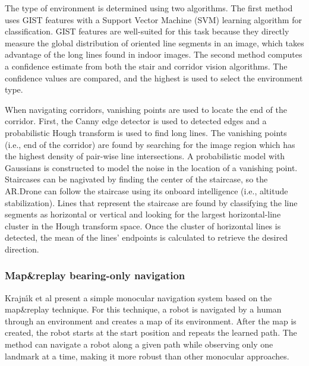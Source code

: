 The type of environment is determined using two algorithms.
The first method uses GIST features \cite{oliva2001modeling} with a Support Vector Machine (SVM) learning algorithm for classification.
GIST features are well-suited for this task because they directly measure the global distribution of oriented line segments in an image, which takes advantage of the long lines found in indoor images.
The second method computes a confidence estimate from both the stair and corridor vision algorithms.
The confidence values are compared, and the highest is used to select the environment type.

When navigating corridors, vanishing points are used to locate the end of the corridor. 
First, the Canny edge detector is used to detected edges and a probabilistic Hough transform is used to find long lines.
The vanishing points (i.e., end of the corridor) are found by searching for the image region which has the highest density of pair-wise line intersections.
A probabilistic model with Gaussians is constructed to model the noise in the location of a vanishing point.
Staircases can be nagivated by finding the center of the staircase, so the AR.Drone can follow the staircase using its onboard intelligence (i.e., altitude stabilization).
Lines that represent the staircase are found by classifying the line segments as horizontal or vertical and looking for the largest horizontal-line cluster in the Hough transform space.
Once the cluster of horizontal lines is detected, the mean of the lines' endpoints is calculated to retrieve the desired direction.

\subsubsection{Map\&replay bearing-only navigation}
Krajn{\'\i}k et al \cite{krajník2010simple,faiglsurveillance,krajník2011ar} present a simple monocular navigation system based on the map\&replay technique.
For this technique, a robot is navigated by a human through an environment and creates a map of its environment.
After the map is created, the robot starts at the start position and repeats the learned path.
The method can navigate a robot along a given path while observing only one landmark at a time, making it more robust than other monocular approaches.

